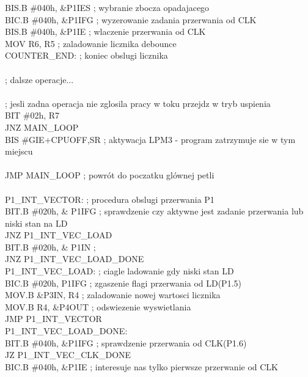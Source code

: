 \documentclass[a4paper,titlepage,11pt,floatssmall]{mwrep}
\begin{document}
    BIS.B \#040h, \&P1IES     ; wybranie zbocza opadajacego\\
    BIC.B \#040h, \&P1IFG     ; wyzerowanie zadania przerwania od CLK\\
    BIS.B \#040h, \&P1IE      ; wlaczenie przerwania od CLK\\
    MOV R6, R5				; zaladowanie licznika debounce\\
COUNTER\_{}END:				; koniec obslugi licznika\\
\\
    ; dalsze operacje...\\
\\
    ; jesli zadna operacja nie zglosila pracy w toku przejdz w tryb uspienia\\
    BIT \#02h, R7\\
    JNZ MAIN\_{}LOOP\\
	BIS \#GIE+CPUOFF,SR ; aktywacja LPM3 - program zatrzymuje sie w tym miejscu\\
\\
    JMP MAIN\_{}LOOP ; powrót do poczatku glównej petli    \\
\\
P1\_{}INT\_{}VECTOR:                          ; procedura obslugi przerwania P1\\
        BIT.B \#020h, \& P1IFG             ; sprawdzenie czy aktywne jest zadanie przerwania lub niski stan na LD\\
        JNZ P1\_{}INT\_{}VEC\_{}LOAD\\
        BIT.B \#020h, \& P1IN      ;\\
        JNZ P1\_{}INT\_{}VEC\_{}LOAD\_{}DONE\\
P1\_{}INT\_{}VEC\_{}LOAD:                        ; ciagle ladowanie gdy niski stan LD\\
        BIC.B \#020h, P1IFG              ; zgaszenie flagi przerwania od LD(P1.5)\\
		MOV.B \&P3IN, R4 	        ; zaladowanie nowej wartosci licznika\\
		MOV.B R4, \&P4OUT	        ; odswiezenie wyswietlania\\
        JMP P1\_{}INT\_{}VECTOR\\
P1\_{}INT\_{}VEC\_{}LOAD\_{}DONE:\\
        BIT.B \#040h, \&P1IFG             ; sprawdzenie przerwania od CLK(P1.6)\\
        JZ P1\_{}INT\_{}VEC\_{}CLK\_{}DONE\\
        BIC.B \#040h, \&P1IE              ; interesuje nas tylko pierwsze przerwanie od CLK\\
\end{document}
